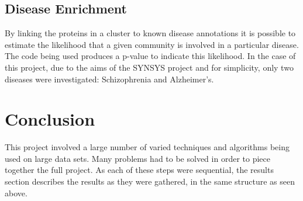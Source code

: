 \subsection{Disease Enrichment}

By linking the proteins in a cluster to known disease annotations it is possible to estimate the likelihood that a given community is involved in a particular disease.
The code being used produces a p-value to indicate this likelihood.
In the case of this project, due to the aims of the SYNSYS project and for simplicity, only two diseases were investigated: Schizophrenia and Alzheimer's.



\section*{Conclusion}

This project involved a large number of varied techniques and algorithms being used on large data sets.
Many problems had to be solved in order to piece together the full project.
As each of these steps were sequential, the results section describes the results as they were gathered, in the same structure as seen above.
